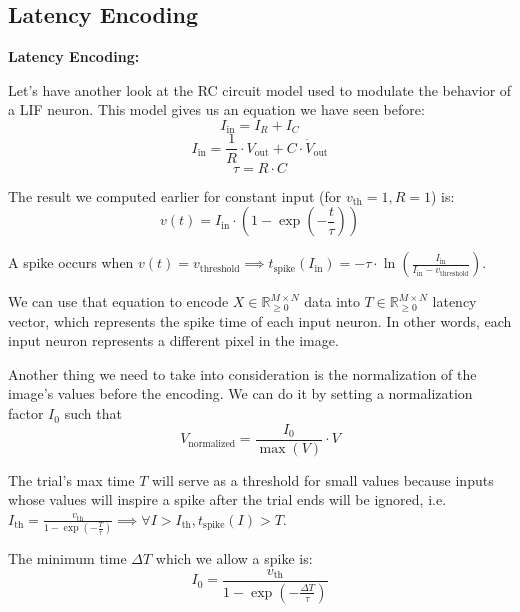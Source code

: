 \subsection{Latency Encoding}

\textbf{Latency Encoding:}

Let's have another look at the RC circuit model used to modulate the behavior of a LIF neuron. This model gives us an equation we have seen before:
\begin{equation}
I_{\text{in}} = I_R + I_C
\end{equation}
\begin{equation}
I_{\text{in}} = \frac{1}{R} \cdot V_{\text{out}} + C \cdot \dot{V}_{\text{out}}
\end{equation}
\begin{equation}
\tau = R \cdot C
\end{equation}

The result we computed earlier for constant input (for $v_{\text{th}} = 1, R = 1$) is:
\begin{equation}
v(t) = I_{\text{in}} \cdot \left(1 - \exp\left(-\frac{t}{\tau}\right)\right)
\end{equation}

A spike occurs when $v(t) = v_{\text{threshold}} \implies t_{\text{spike}}(I_{\text{in}}) = -\tau \cdot \ln\left(\frac{I_{\text{in}}}{I_{\text{in}} - v_{\text{threshold}}}\right)$.

We can use that equation to encode $X \in \mathbb{R}_{\geq 0}^{M \times N}$ data into $T \in \mathbb{R}_{\geq 0}^{M \times N}$ latency vector, which represents the spike time of each input neuron. In other words, each input neuron represents a different pixel in the image.

Another thing we need to take into consideration is the normalization of the image's values before the encoding. We can do it by setting a normalization factor $I_0$ such that 
\begin{equation}
V_{\text{normalized}} = \frac{I_0}{\max(V)} \cdot V
\end{equation}

The trial's max time $T$ will serve as a threshold for small values because inputs whose values will inspire a spike after the trial ends will be ignored, i.e. $I_{\text{th}} = \frac{v_{\text{th}}}{1 - \exp\left(-\frac{T}{\tau}\right)} \implies \forall I > I_{\text{th}}, t_{\text{spike}}(I) > T$.

The minimum time $\Delta T$ which we allow a spike is:
\begin{equation}
I_0 = \frac{v_{\text{th}}}{1 - \exp\left(-\frac{\Delta T}{\tau}\right)}
\end{equation}

